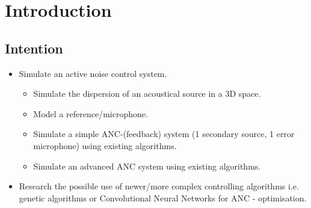 \chapter{Introduction}
\label{chap:introduction}


\section{Intention}
    \begin{itemize}
        \item Simulate an active noise control system. 
    \begin{itemize}
        \item Simulate the dispersion of an acoustical source in a 3D space.
        \item Model a reference/microphone.
        \item Simulate a simple ANC-(feedback) system (1 secondary source, 1 error microphone) using existing algorithms.
        \item Simulate an advanced ANC system using existing algorithms.
    \end{itemize}
        \item Research the possible use of newer/more complex controlling algorithms i.e. genetic algorithms or Convolutional Neural Networks for ANC - optimisation.
\end{itemize}



